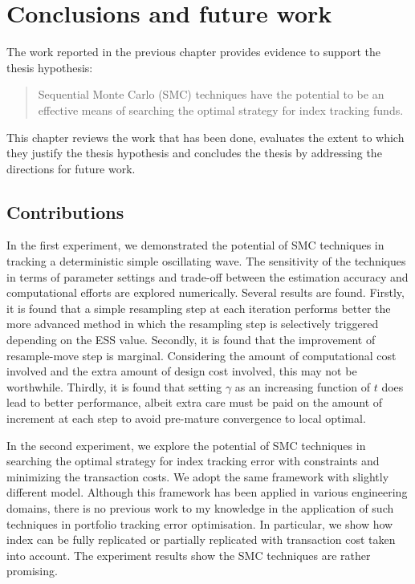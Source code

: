 \chapter{Conclusions and future work}
\graphicspath{{Chapter5/figures/}}
\label{cha:conclusions}
The work reported in the previous chapter provides evidence to support
the thesis hypothesis:
\begin{quote}
Sequential Monte Carlo (SMC) techniques have the potential to be an effective means of searching the optimal strategy for index tracking funds.
\end{quote}
This chapter reviews the work that has been done, evaluates the extent
to which they justify the thesis hypothesis and concludes the thesis
by addressing the directions for future work.

\section{Contributions}
In the first experiment, we demonstrated the potential of SMC techniques in tracking a deterministic simple oscillating wave. The sensitivity of the techniques in terms of parameter settings and trade-off between the estimation accuracy and computational efforts are explored numerically. Several results are found. Firstly, it is found that a simple resampling step at each iteration performs better the more advanced method in which the resampling step is selectively triggered depending on the ESS value. Secondly, it is found that the improvement of resample-move step is marginal. Considering the amount of computational cost involved and the extra amount of design cost involved, this may not be worthwhile. Thirdly, it is found that setting $\gamma$ as an increasing function of $t$ does lead to better performance, albeit extra care must be paid on the amount of increment at each step to avoid pre-mature convergence to local optimal. 

In the second experiment, we explore the potential of SMC techniques in searching the optimal strategy for index tracking error with constraints and minimizing the transaction costs. We adopt the same framework with slightly different model. Although this framework has been applied in various engineering domains, there is no previous work to my knowledge in the application of such techniques in portfolio tracking error optimisation. In particular, we show how index can be fully replicated or partially replicated with transaction cost taken into account. The experiment results show the SMC techniques are rather promising.

